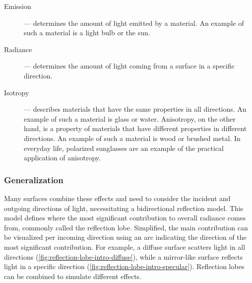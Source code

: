\begin{description}
  \item[Emission] — determines the amount of light emitted by a material. An example of such a material is a light bulb or the sun.
  \item[Radiance] — determines the amount of light coming from a surface in a specific direction.
  \item[Isotropy] — describes materials that have the same properties in all directions. An example of such a material is glass or water. Anisotropy, on the other hand, is a property of materials that have different properties in different directions. An example of such a material is wood or brushed metal. In everyday life, polarized sunglasses are an example of the practical application of anisotropy.
\end{description}

\subsubsection{Generalization}
\label{sec:physics-generalization}

Many surfaces combine these effects and need to consider the incident and outgoing directions of light, necessitating a bidirectional reflection model. This model defines where the most significant contribution to overall radiance comes from, commonly called the reflection lobe. Simplified, the main contribution can be visualized per incoming direction using an arc indicating the direction of the most significant contribution. For example, a diffuse surface scatters light in all directions (\autoref{fig:reflection-lobe-intro-diffuse}), while a mirror-like surface reflects light in a specific direction (\autoref{fig:reflection-lobe-intro-specular}). Reflection lobes can be combined to simulate different effects.

